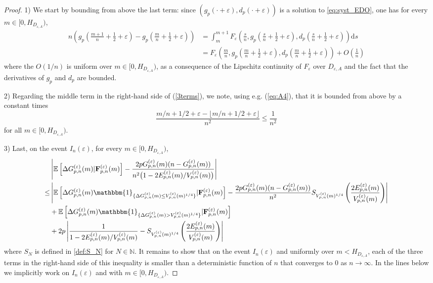 \documentclass[a4, 11pt]{article}
\numberwithin{equation}{section}
\theoremstyle{plain}
\theoremstyle{definition}
\theoremstyle{remark}
\begin{document}
\begin{proof}
1) We start by bounding from above the last term: since $\left(g_p(\cdot+\varepsilon),d_p(\cdot+\varepsilon)\right)$ is a solution to \eqref{eq:syst_EDO}, one has for every $m \in \big[0,H_{D_{\varepsilon,A}}\big)$,
\begin{align*}
n\left(g_p\left(\frac{m+1}{n}+\frac{1}{2}+\varepsilon\right)-g_p\left(\frac{m}{n}+\frac{1}{2}+\varepsilon\right)\right)&=\int_{m}^{m+1}F_{\varepsilon}\left(\frac{s}{n},g_p\left(\frac{s}{n}+\frac{1}{2}+\varepsilon\right),d_p\left(\frac{s}{n}+\frac{1}{2}+\varepsilon\right)\right)\mathrm{d}s\\
&=F_{\varepsilon}\left(\frac{m}{n},g_p\left(\frac{m}{n}+\frac{1}{2}+\varepsilon\right),d_p\left(\frac{m}{n}+\frac{1}{2}+\varepsilon\right)\right)+O\left(\frac{1}{n}\right)
\end{align*}
where the $O\left(1/n\right)$ is uniform over $m \in \big[0,H_{D_{\varepsilon,A}}\big)$, as a consequence of the Lipschitz continuity of $F_{\varepsilon}$ over $D_{\varepsilon,A}$ and the fact that the derivatives of $g_p$ and $d_p$ are bounded. 

2) Regarding the middle term  in the right-hand side of (\ref{3terms}), we note, using e.g. (\ref{eq:A4}), that it is bounded from above by a constant times 
$$
\frac{m/n+1/2+\varepsilon-\lfloor m/n+1/2+\varepsilon \rfloor}{n^2} \leq \frac{1}{n^2}
$$
for all $m\in \big[0,H_{D_{\varepsilon,A}}\big)$.

3) Last, on the event $I_n(\varepsilon)$, for every $m\in \big[0,H_{D_{\varepsilon,A}}\big)$,
		\begin{align*}
		  &\left\vert\mathbb{E}\left[\Delta G_{p,n}^{(\varepsilon)}(m) | {\mathbf{F}}^{(\varepsilon)}_{p,n}(m)  \right] -\frac{2pG_{p,n}^{(\varepsilon)}(m)(n-G_{p,n}^{(\varepsilon)}(m))}{n^2\big(1-2E_{p,n}^{(\varepsilon)}(m)/V_{p,n}^{(\varepsilon)}(m)\big)}\right\vert\\
			\leq &\left\vert \mathbb{E}\left[\Delta G_{p,n}^{(\varepsilon)}(m)\mathbbm{1}_{\{\Delta G_{p,n}^{(\varepsilon)}(m)\leq V_{p,n}^{(\varepsilon)}(m)^{1/4}\}} | {\mathbf{F}}^{(\varepsilon)}_{p,n}(m)  \right]-\frac{2p G_{p,n}^{(\varepsilon)}(m)(n-G_{p,n}^{(\varepsilon)}(m))}{n^2}S_{V_{p,n}^{(\varepsilon)}(m)^{1/4}}\left(\frac{2E_{p,n}^{(\varepsilon)}(m)}{V_{p,n}^{(\varepsilon)}(m)}\right) \right\vert \\
			&+  \mathbb{E}\left[\Delta G_{p,n}^{(\varepsilon)}(m)\mathbbm{1}_{\{\Delta G_{p,n}^{(\varepsilon)}(m)> V_{p,n}^{(\varepsilon)}(m)^{1/4}\}} | {\mathbf{F}}^{(\varepsilon)}_{p,n}(m)  \right] \\
			&+ 2p \left\vert \frac{1}{1-2E_{p,n}^{(\varepsilon)}(m)/V_{p,n}^{(\varepsilon)}(m)}-S_{V_{p,n}^{(\varepsilon)}(m)^{1/4}}\left(\frac{2E_{p,n}^{(\varepsilon)}(m)}{V_{p,n}^{(\varepsilon)}(m)}\right)  \right\vert 
		\end{align*}
		where $S_{N}$ is defined in \eqref{def:S_N} for $N \in \mathbb N$. It remains to show that on the event $I_n(\varepsilon)$ and uniformly over $m<H_{D_{\varepsilon,A}}$, each of the three terms in the right-hand side of this inequality is smaller than a deterministic function of $n$ that converges to 0 as $n \rightarrow \infty$. In the lines below we implicitly work on   $I_n(\varepsilon)$ and with  $m\in \big[0,H_{D_{\varepsilon,A}}\big)$.
		

\end{proof}
\end{document}
